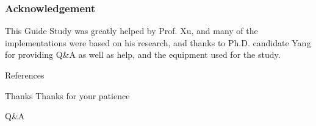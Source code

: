 \documentclass{beamer}
\begin{document}
\appendix
\begin{frame}
  \frametitle{Acknowledgement}
  This Guide Study was greatly helped by Prof. Xu, and many of the implementations were based on his research, and thanks to Ph.D. candidate Yang for providing Q\&A as well as help, and the equipment used for the study.
\end{frame}

\begin{frame}[allowframebreaks]{References} 
\fontsize{7pt}{7pt}\selectfont
\end{frame}

\begin{frame}{Thanks} 
  \fontsize{23pt}{23pt}\selectfont
  \centering
  Thanks for your patience

  \vspace{0.2in}
  
  Q\&A
\end{frame}
\end{document}
